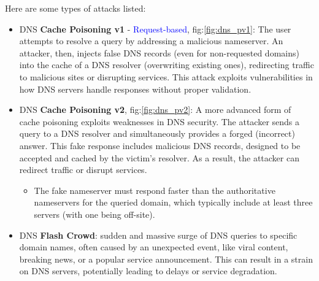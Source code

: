Here are some types of attacks listed:
\begin{itemize}
    \item DNS \textbf{Cache Poisoning v1} - \textcolor{Blue}{Request-based}, fig:\ref{fig:dns_pv1}: 
    The user attempts to resolve a query by addressing a malicious nameserver. An attacker, then, injects false DNS records (even for non-requested domains) into the cache of a DNS resolver (overwriting existing ones), redirecting traffic to malicious sites or disrupting services. This attack exploits vulnerabilities in how DNS servers handle responses without proper validation.
    \item DNS \textbf{Cache Poisoning v2}, fig:\ref{fig:dns_pv2}: 
    A more advanced form of cache poisoning exploits weaknesses in DNS security. The attacker sends a query to a DNS resolver and simultaneously provides a forged (incorrect) answer. This fake response includes malicious DNS records, designed to be accepted and cached by the victim’s resolver. As a result, the attacker can redirect traffic or disrupt services.
    \begin{itemize}
        \item The fake nameserver must respond faster than the authoritative nameservers for the queried domain, which typically include at least three servers (with one being off-site).
    \end{itemize}
    \item DNS \textbf{Flash Crowd}: sudden and massive surge of DNS queries to specific domain names, often caused by an unexpected event, like viral content, breaking news, or a popular service announcement. This can result in a strain on DNS servers, potentially leading to delays or service degradation.
\end{itemize}

